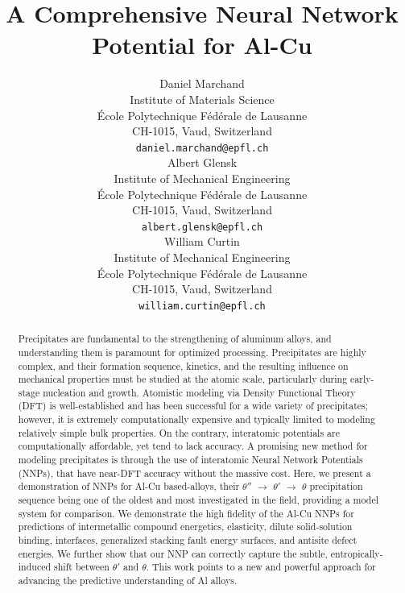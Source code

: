 \documentclass{article}
\title{A Comprehensive Neural Network Potential for Al-Cu}
\author{
 Daniel Marchand \\
  Institute of Materials Science \\
  École Polytechnique Fédérale de Lausanne \\
  CH-1015, Vaud, Switzerland \\
  \texttt{daniel.marchand@epfl.ch} \\
   \And
 Albert Glensk \\
  Institute of Mechanical Engineering \\
  École Polytechnique Fédérale de Lausanne \\
  CH-1015, Vaud, Switzerland \\
  \texttt{albert.glensk@epfl.ch} \\
  \And
 William Curtin \\
  Institute of Mechanical Engineering \\
  École Polytechnique Fédérale de Lausanne \\
  CH-1015, Vaud, Switzerland \\
  \texttt{william.curtin@epfl.ch} \\
}
\begin{document}
\maketitle
\begin{abstract}
Precipitates are fundamental to the strengthening of aluminum alloys, and understanding them is paramount for optimized processing.
Precipitates are highly complex, and their formation sequence, kinetics, and the resulting influence on mechanical properties must be studied at the atomic scale, particularly during early-stage nucleation and growth.
Atomistic modeling via Density Functional Theory (DFT) is well-established and has been successful for a wide variety of precipitates; however, it is extremely computationally expensive and typically limited to modeling relatively simple bulk properties. On the contrary, interatomic potentials are computationally affordable, yet tend to lack accuracy. A promising new method for modeling precipitates is through the use of interatomic Neural Network Potentials (NNPs), that have near-DFT accuracy without the massive cost. 
Here, we present a demonstration of NNPs for Al-Cu based-alloys, 
their $\theta''$ $\rightarrow$ $\theta'$ $\rightarrow$ $\theta$ precipitation sequence
being one of the oldest and most investigated in the field, providing a model system for comparison.
We demonstrate the high fidelity of the Al-Cu NNPs for predictions of intermetallic compound energetics, elasticity, dilute solid-solution binding, interfaces, generalized stacking fault energy surfaces, and antisite defect energies.
We further show that our NNP can correctly capture the subtle, entropically-induced shift between $\theta'$ and $\theta$.
This work points to a new and powerful approach for advancing the predictive understanding of Al alloys. 
\end{abstract}


\end{document}
